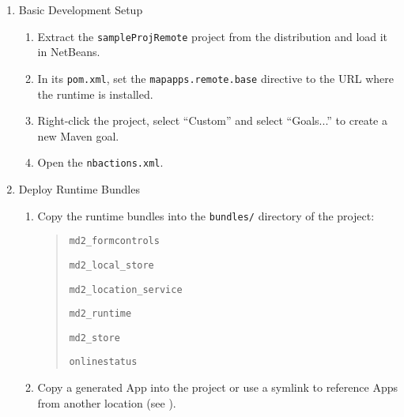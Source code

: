 \begin{enumerate}
\item {Basic \mapapps Development Setup} \label{subsec:basic-setup}

\begin{enumerate}
\item Extract the \lstinline|sampleProjRemote| project from the \mapapps distribution and load it in NetBeans. \label{item:extraction}
\item In its \lstinline|pom.xml|,
 set the \lstinline|mapapps.remote.base| directive to the URL where the \mapapps runtime is installed.
\item Right-click the project, select \enquote{Custom} and select \enquote{Goals...} to create a new Maven goal. 
\item Open the \lstinline|nbactions.xml|. 

\end{enumerate}

\item {Deploy \MD Runtime Bundles}
\begin{enumerate}
\item Copy the \MD runtime bundles into the \texttt{bundles/} directory of the project:
	\begin{quotation}
		 \texttt{md2\_formcontrols}
		 
		 \texttt{md2\_local\_store}
		 
		 \texttt{md2\_location\_service}
		 
		 \texttt{md2\_runtime}
		 
		 \texttt{md2\_store}
		 
		 \texttt{onlinestatus}
	\end{quotation}

\item Copy a generated \MD App into the project or use a symlink to reference Apps from another location (see ).
\end{enumerate}


\end{enumerate}